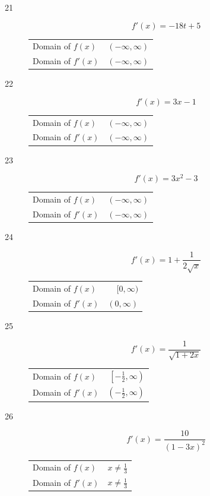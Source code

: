\documentclass[letterpaper, landscape]{exam}
\begin{document}
\begin{description}
      \item[21]
        \[
          f'(x) = -18t + 5
        \]
        \begin{tabular}[H]{lr}
          \toprule
          Domain of $f(x)$  & $(-\infty, \infty)$ \\
          Domain of $f'(x)$ & $(-\infty, \infty)$ \\
          \bottomrule
        \end{tabular}

      \item[22]
        \[
          f'(x) = 3x - 1
        \]
        \begin{tabular}[H]{lr}
          \toprule
          Domain of $f(x)$  & $(-\infty, \infty)$ \\
          Domain of $f'(x)$ & $(-\infty, \infty)$ \\
          \bottomrule
        \end{tabular}

      \item[23]
        \[
          f'(x) = 3x^2 - 3
        \]
        \begin{tabular}[H]{lr}
          \toprule
          Domain of $f(x)$  & $(-\infty, \infty)$ \\
          Domain of $f'(x)$ & $(-\infty, \infty)$ \\
          \bottomrule
        \end{tabular}

      \item[24]
        \[
          f'(x) = 1 + \frac{1}{ 2 \sqrt{x} }
        \]
        \begin{tabular}[H]{lr}
          \toprule
          Domain of $f(x)$  & $[ 0, \infty )$ \\
          Domain of $f'(x)$ & $( 0, \infty )$ \\
          \bottomrule
        \end{tabular}

      \item[25]
        \[
          f'(x) = \frac{1}{\sqrt{1 + 2x}}
        \]
        \begin{tabular}[H]{lr}
          \toprule
          Domain of $f(x)$  & $\left[ - \frac{1}{2}, \infty \right)$ \\
          Domain of $f'(x)$ & $\left( - \frac{1}{2}, \infty \right)$ \\
          \bottomrule
        \end{tabular}

      \item[26]
        \[
          f'(x) = \frac{10}{(1 - 3x)^2}
        \]
        \begin{tabular}[H]{lr}
          \toprule
          Domain of $f(x)$  & $x \neq \frac{1}{3}$ \\
          Domain of $f'(x)$ & $x \neq \frac{1}{3}$ \\
          \bottomrule
        \end{tabular}


\end{description}
\end{document}
